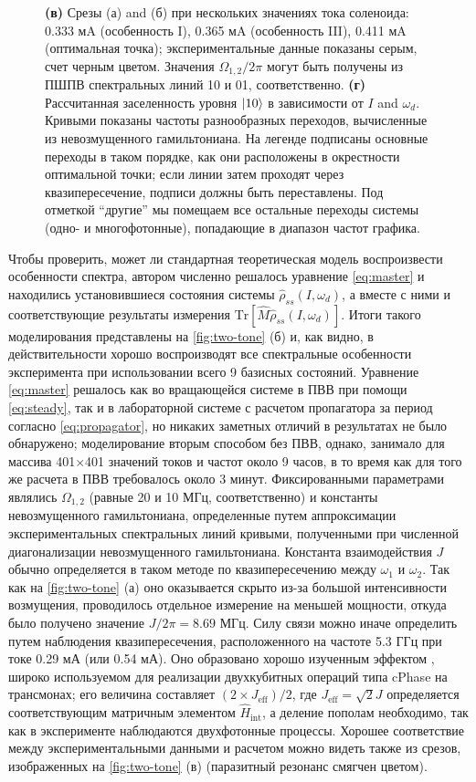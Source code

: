 \documentclass[14pt, a4paper]{extreport}
\DeclarePairedDelimiter\ket{\lvert}{\rangle}
\newcommand{\Tr}{\text{Tr}}
\numberwithin{equation}{section}
\begin{document}
\begin{figure}
{		\textbf{(в)} Срезы (а) and (б) при нескольких значениях тока соленоида: 0.333 мA (особенность I), 0.365 мA (особенность III), 0.411 мA 
		(оптимальная точка); 
		экспериментальные данные показаны серым, счет черным цветом. Значения $\Omega_{1,2}/2\pi$ могут быть получены из  
		ПШПВ спектральных линий 10 и 01, 
		соответственно. \textbf{(г)} Рассчитанная заселенность  
		уровня $\ket{10}$ в зависимости от $I$ and $\omega_d$. Кривыми показаны частоты разнообразных переходов, вычисленные из невозмущенного гамильтониана. На легенде подписаны основные переходы в таком порядке, как они расположены в окрестности оптимальной точки; если линии затем проходят через квазипересечение, подписи должны быть переставлены. Под отметкой ``другие'' мы помещаем все остальные переходы системы (одно- и многофотонные), попадающие в диапазон частот графика.}
	\label{fig:two-tone}
\end{figure}


Чтобы проверить, может ли стандартная теоретическая модель воспроизвести особенности спектра, автором численно решалось уравнение \eqref{eq:master} и находились установившиеся состояния системы $\hat \rho_{ss}(I, \omega_d)$, а вместе с ними и соответствующие результаты измерения $\Tr[\hat M \hat \rho_{ss}(I, \omega_d)]$. Итоги такого моделирования представлены на \autoref{fig:two-tone} (б) и, как видно, в действительности хорошо воспроизводят все спектральные особенности эксперимента при использовании всего 9 базисных состояний. Уравнение \eqref{eq:master} решалось как во вращающейся системе в ПВВ при помощи \eqref{eq:steady}, так и в лабораторной системе с расчетом пропагатора за период согласно \eqref{eq:propagator}, но никаких заметных отличий в результатах не было обнаружено; моделирование вторым способом без ПВВ, однако, занимало для массива 401$\times$401 значений токов и частот около 9 часов, в то время как для того же расчета в ПВВ требовалось около 3 минут. Фиксированными параметрами являлись $\Omega_{1,2}$ (равные 20 и 10 МГц, соответственно) и константы невозмущенного гамильтониана, определенные путем аппроксимации экспериментальных спектральных линий кривыми, полученными при численной диагонализации невозмущенного гамильтониана. Константа взаимодействия $J$ обычно определяется в таком методе по квазипересечению между $\omega_1$ и $\omega_2$. Так как на \autoref{fig:two-tone} (а) оно оказывается скрыто из-за большой интенсивности возмущения, проводилось отдельное измерение на меньшей мощности, откуда было получено значение $J/2\pi = 8.69$ МГц. Силу связи можно иначе определить путем наблюдения квазипересечения, расположенного на частоте 5.3 ГГц при токе 0.29 мА (или 0.54 мА). Оно образовано хорошо изученным эффектом \cite{dicarlo2009demonstration}, широко используемом для реализации двухкубитных операций типа cPhase на трансмонах; его величина составляет $(2\times J_\text{eff})/2$, где $J_\text{eff} = \sqrt 2 J$ определяется соответствующим матричным элементом $\hat H_\text{int}$, а деление пополам необходимо, так как в эксперименте наблюдаются двухфотонные процессы. Хорошее соответствие между экспериментальными данными и расчетом можно видеть также из срезов, изображенных на \autoref{fig:two-tone} (в) (паразитный резонанс смягчен цветом).
\end{document}

